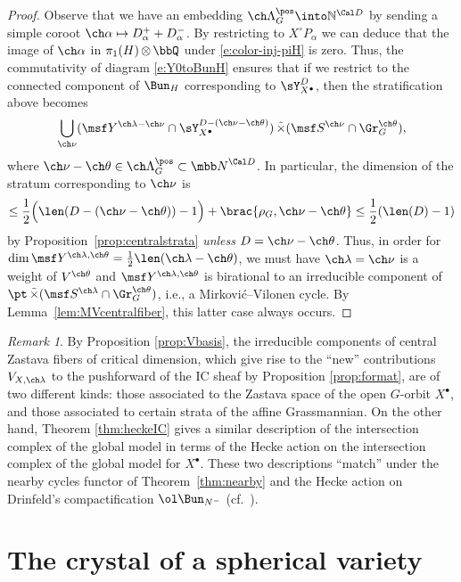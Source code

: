 \documentclass[final]{amsart}
\theoremstyle{remark}
\newtheorem{rem}[subsubsection]{Remark}
\theoremstyle{definition}
\DeclareMathOperator*{\ttimes}{\tilde\times}
\DeclareMathOperator*{\ot}{\otimes}
\numberwithin{equation}{section}
\begin{document}
\begin{proof}
Observe that we have an embedding $\ch\Lambda^\pos_G \into \mathbb N^{\Cal D}$
by sending a simple coroot $\ch\alpha \mapsto D_\alpha^+ + D_\alpha^-$. 
By restricting to $X^\circ P_\alpha$ we can deduce that the image of
$\ch\alpha$ in $\pi_1(H)\ot\bbQ$ under \eqref{e:color-inj-piH} is zero. 
Thus, the commutativity of diagram \eqref{e:Y0toBunH} ensures that if
we restrict to the connected component of $\Bun_H$ corresponding to 
$\sY^{D}_{X^\bullet}$, then the stratification above becomes 
\[ \bigcup_{\ch\nu} (\msf Y^{\ch\lambda-\ch\nu}\cap \sY^{D -(\ch\nu-\ch\theta)}_{X^\bullet}) \ttimes (\msf S^{\ch\nu} \cap\Gr^{\ch\theta}_G ),
\]
where $\ch\nu-\ch\theta\in \ch\Lambda^\pos_G \subset {\mbb N}^{\Cal D}$.
In particular, the dimension of the stratum corresponding to $\ch\nu$ is 
\[ \le \frac 1 2 \Bigl(\len(D-(\ch\nu-\ch\theta))-1 \Bigr)+ \brac{\rho_G, \ch\nu-\ch\theta}
\le \frac 1 2 (\len(D)-1) \]
by Proposition~\ref{prop:centralstrata} \emph{unless} $D= \ch\nu-\ch\theta$. 
Thus, in order for $\dim \msf Y^{\ch\lambda,\ch\theta}=\frac 1 2 \len(\ch\lambda-\ch\theta)$, we must have
$\ch\lambda=\ch\nu$ is a weight of $V^{\ch\theta}$ 
and $\msf Y^{\ch\lambda,\ch\theta}$ is birational to an irreducible
component of $\pt \ttimes (\msf S^{\ch\lambda}\cap \Gr^{\ch\theta}_G)$, i.e., 
a Mirkovi\'c--Vilonen cycle. By Lemma~\ref{lem:MVcentralfiber}, 
this latter case always occurs. 
\end{proof}


\begin{rem}
 By Proposition \ref{prop:Vbasis}, the irreducible components of central Zastava fibers of critical dimension, which give rise to the ``new'' contributions $V_{X,\ch\lambda}$ to the pushforward of the IC sheaf by Proposition \ref{prop:format}, are of two different kinds: those associated to the Zastava space of the open $G$-orbit $X^\bullet$, and those associated to certain strata of the affine Grassmannian. On the other hand, Theorem \ref{thm:heckeIC} gives a similar description of the intersection complex of the global model in terms of the Hecke action on the intersection complex of the global model for $X^\bullet$. 
These two descriptions ``match'' under the nearby cycles functor of Theorem~\ref{thm:nearby}
and the Hecke action on Drinfeld's compactification $\ol\Bun_{N^-}$ (cf.~\cite{BG}). 
\end{rem}


\section{The crystal of a spherical variety} \label{sect:crystal}
\end{document}
